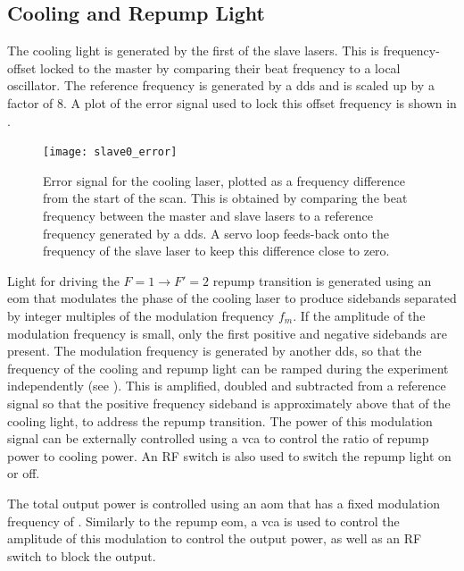 \subsection{Cooling and Repump Light}
The cooling light is generated by the first of the slave lasers. This is
frequency-offset locked to the master by comparing their beat frequency to a
local oscillator. The reference frequency is generated by a \ac{dds} and is
scaled up by a factor of 8. A plot of the error signal used to lock this offset
frequency is shown in .
\begin{figure}[!htbp]
	\centering
	\texttt{[image: slave0\_error]}
	\caption[Error Signal for the \Muquans\ Cooling laser.]{Error signal for the \Muquans cooling laser, plotted as a frequency difference from the start of the scan. This is obtained by comparing the beat frequency between the master and slave lasers to a reference frequency generated by a \ac{dds}. A servo loop feeds-back onto the frequency of the slave laser to keep this difference close to zero.}\label{fig:slave_offset}
\end{figure}
\par\noindent Light for driving the \(F=1 \rightarrow F'=2\) repump transition
is generated using an \ac{eom} that modulates the phase of the cooling laser to
produce sidebands separated by integer multiples of the modulation frequency
\(f_m\). If the amplitude of the modulation frequency is small, only the first
positive and negative sidebands are present. The modulation frequency is
generated by another \ac{dds}, so that the frequency of the cooling and repump
light can be ramped during the experiment independently (see
). This is amplified, doubled and subtracted
from a  reference signal so that the positive
frequency sideband is approximately  above that of the
cooling light, to address the repump transition. The power of this modulation
signal can be externally controlled using a \ac{vca} to control the ratio of
repump power to cooling power. An RF switch is also used to switch the repump
light on or off. \par\noindent The total output power is controlled using an
\ac{aom} that has a fixed modulation frequency of .
Similarly to the repump \ac{eom}, a \ac{vca} is used to control the amplitude of
this modulation to control the output power, as well as an RF switch to block
the output.

